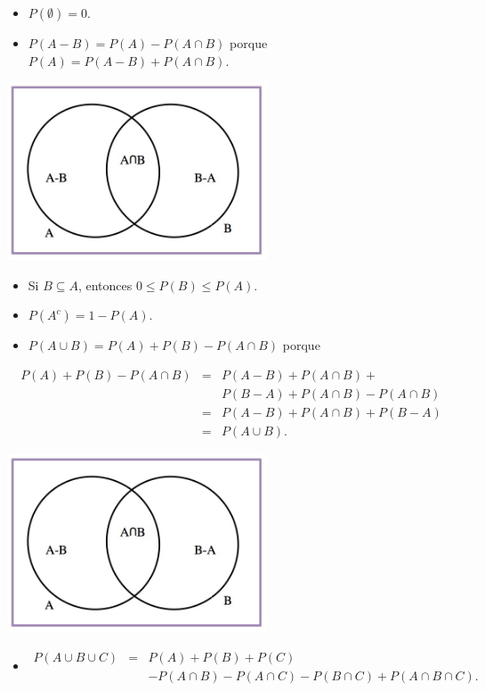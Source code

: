 \documentclass[]{book}
\providecommand{\tightlist}{%
  \setlength{\itemsep}{0pt}\setlength{\parskip}{0pt}}
\begin{document}
\begin{itemize}
\item
  \(P(\emptyset)=0\).
\item
  \(P(A-B)=P(A)-P(A\cap B)\) porque \(P(A)=P(A-B)+P(A\cap B)\).
\end{itemize}

\includegraphics[width=\textwidth,height=2.08333in]{Images/proba1dibujos/A-B.jpg}

\begin{itemize}
\item
  Si \(B\subseteq A\), entonces \(0\leq P(B)\leq P(A)\).
\item
  \(P(A^c)=1-P(A)\).
\item
  \(P(A\cup B)=P(A)+P(B)-P(A\cap B)\) porque
\end{itemize}

\begin{eqnarray*}
P(A)+P(B)-P(A\cap B) &=& P(A-B)+P(A\cap B)+\\
 & & P(B-A)+ P(A\cap  B)-P(A\cap  B)\\
&=& P(A-B)+P(A\cap B)+ P(B-A) \\
&=& P(A\cup B).
\end{eqnarray*}

\includegraphics[width=\textwidth,height=2.08333in]{Images/proba1dibujos/A-B.jpg}

\begin{itemize}
\tightlist
\item
  \begin{eqnarray*}
  P(A\cup B\cup C)&=&P(A)+P(B)+P(C)  \\ &&-P(A\cap B)-P(A\cap C)-P(B\cap C)  +P(A\cap B\cap C).
  \end{eqnarray*}
\end{itemize}
\end{document}

